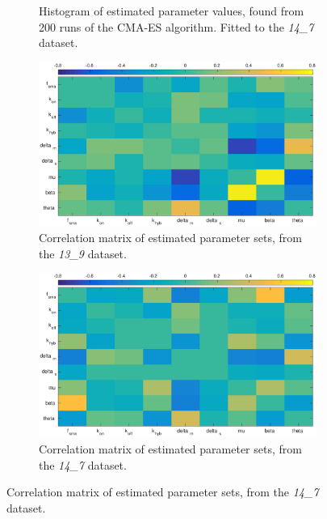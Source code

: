 \documentclass[10pt,journal]{./IEEE_latex_class/IEEEtran}
\begin{document}
\begin{figure}
\begin{subfigure}[c]{0.49\textwidth}
        \caption{Histogram of estimated parameter values, found from 200 runs of the CMA-ES algorithm. Fitted to the \textit{14\_7} dataset. }
        \label{InitialResults_14_7_hist}
    \end{subfigure}

        \begin{subfigure}[c]{0.49\textwidth}
        \centering
    \includegraphics[scale = 0.25, clip = true, trim = 100 0 90 0]{13_9_heatmap.eps}
        \caption{Correlation matrix of estimated parameter sets, from the  \textit{13\_9} dataset. }
        \label{InitialResults_13_9_correlation}
    \end{subfigure}
    \begin{subfigure}[c]{0.49\textwidth}
    \centering
        \includegraphics[scale = 0.25, clip = true, trim = 80 0 70 0]{14_7_heatmap.eps}
        \caption{Correlation matrix of estimated parameter sets, from the  \textit{14\_7} dataset.}
        \label{InitialResults_14_7_correlation}
    \end{subfigure}
    

\end{figure}
\end{document}

